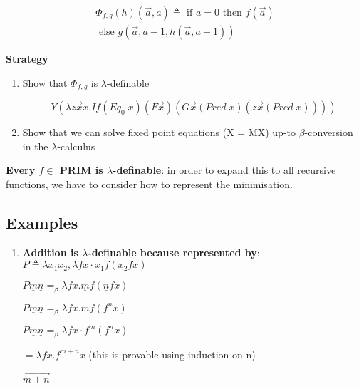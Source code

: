 \documentclass{article}
\begin{document}
\begin{equation}
    \begin{array}{c}{\Phi_{f, g}(h)(\vec{a}, a) \triangleq \text { if } a=0 \text { then } f(\vec{a})} \\ {\text { else } g(\vec{a}, a-1, h(\vec{a}, a-1))}\end{array}
\end{equation}

\bigskip
\textbf{Strategy}
\begin{enumerate}
    \item Show that $\Phi_{f, g}$ is $\lambda$-definable
    
    $$Y(\lambda z \overrightarrow{x} x . If( Eq _{0} \; x)(F \overrightarrow{x})(G \overrightarrow{x} ( Pred \; x)(z \overrightarrow{x} ( Pred \; x)))) $$
    
    
    \item Show that we can solve fixed point equations (X = MX) up-to $\beta$-conversion in the $\lambda$-calculus
\end{enumerate}

\bigskip
\textbf{Every $f \in$ PRIM is $\lambda$-definable}: in order to expand this to all recursive functions, we have to consider how to represent the minimisation.

\subsection{Examples}
\begin{enumerate}
    \item \textbf{Addition is $\lambda$-definable because represented by}: $P \triangleq \lambda x_{1} x_{2}, \lambda f x \cdot x_{1} f\left(x_{2} f x\right)$
    
    $P \underline{m} \underline{n}=_{\beta} \lambda f x . \underline{m} f(\underline{n} fx)$
    
    $P \underline{m} \underline{n}=_{\beta}\lambda f x . m f\left(f^{n} x\right)$
    
    $P \underline{m} \underline{n}=_{\beta} \lambda f x \cdot f^{m}\left(f^{n} x\right)$
    
    $= \lambda f x . f^{m+n} x$
    (this is provable using induction on n)
    
    $\vec{m+n}$
\end{enumerate}
\end{document}
